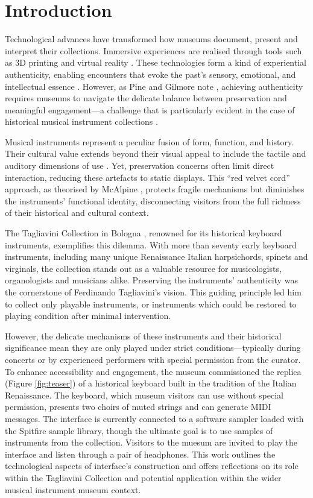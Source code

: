 \section{Introduction}\label{introduction}

Technological advances have transformed how museums document, present and interpret their collections. Immersive experiences are realised through tools such as 3D printing and virtual reality \cite{allard2005use,Wachowiak01082009,RCM_2024_3D,Kuzminsky_LaserScan_2012,Schaich_3D_2007}. These technologies form a kind of experiential authenticity, enabling encounters that evoke the past's sensory, emotional, and intellectual essence \cite{trant_Auth_1999}. However, as Pine and Gilmore note \cite{pinegilmore_2007}, achieving authenticity requires museums to navigate the delicate balance between preservation and meaningful engagement—a challenge that is particularly evident in the case of historical musical instrument collections \cite{McAlpine2014}.

Musical instruments represent a peculiar fusion of form, function, and history. Their cultural value extends beyond their visual appeal to include the tactile and auditory dimensions of use \cite{Fritz2017}. Yet, preservation concerns often limit direct interaction, reducing these artefacts to static displays. This ``red velvet cord'' approach, as theorised by McAlpine \cite{McAlpine2014}, protects fragile mechanisms but diminishes the instruments’ functional identity, disconnecting visitors from the full richness of their historical and cultural context.

The Tagliavini Collection in Bologna \cite{Tagliavini2007}, renowned for its historical keyboard instruments, exemplifies this dilemma. With more than seventy early keyboard instruments, including many unique Renaissance Italian harpsichords, spinets and virginals, the collection stands out as a valuable resource for musicologists, organologists and musicians alike. Preserving the instruments' authenticity was the cornerstone of Ferdinando Tagliavini’s vision. This guiding principle led him to collect only playable instruments, or instruments which could be restored to playing condition after minimal intervention. 

However, the delicate mechanisms of these instruments and their historical significance mean they are only played under strict conditions—typically during concerts or by experienced performers with special permission from the curator. To enhance accessibility and engagement, the museum commissioned the replica (Figure \ref{fig:teaser}) of a historical keyboard built in the tradition of the Italian Renaissance. The keyboard, which museum visitors can use without special permission, presents two choirs of muted strings and can generate MIDI messages. The interface is currently connected to a software sampler loaded with the Spitfire sample library, though the ultimate goal is to use samples of instruments from the collection. Visitors to the muesum are invited to play the interface and listen through a pair of headphones. This work outlines the technological aspects of interface's construction and offers reflections on its role within the Tagliavini Collection and potential application within the wider musical instrument museum context.


